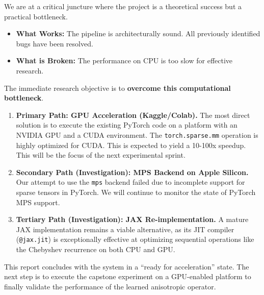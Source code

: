 \documentclass[11pt, letterpaper]{article}
\begin{document}
We are at a critical juncture where the project is a theoretical success but a practical bottleneck.
\begin{itemize}
    \item \textbf{What Works:} The pipeline is architecturally sound. All previously identified bugs have been resolved.
    \item \textbf{What is Broken:} The performance on CPU is too slow for effective research.
\end{itemize}
The immediate research objective is to \textbf{overcome this computational bottleneck}.

\begin{enumerate}
    \item \textbf{Primary Path: GPU Acceleration (Kaggle/Colab).} The most direct solution is to execute the existing PyTorch code on a platform with an NVIDIA GPU and a CUDA environment. The \texttt{torch.sparse.mm} operation is highly optimized for CUDA. This is expected to yield a 10-100x speedup. This will be the focus of the next experimental sprint.

    \item \textbf{Secondary Path (Investigation): MPS Backend on Apple Silicon.} Our attempt to use the \texttt{mps} backend failed due to incomplete support for sparse tensors in PyTorch. We will continue to monitor the state of PyTorch MPS support.

    \item \textbf{Tertiary Path (Investigation): JAX Re-implementation.} A mature JAX implementation remains a viable alternative, as its JIT compiler (\texttt{@jax.jit}) is exceptionally effective at optimizing sequential operations like the Chebyshev recurrence on both CPU and GPU.
\end{enumerate}

This report concludes with the system in a ``ready for acceleration'' state. The next step is to execute the capstone experiment on a GPU-enabled platform to finally validate the performance of the learned anisotropic operator.
\end{document}
